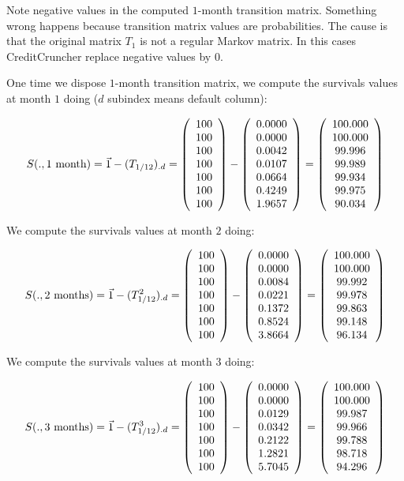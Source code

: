 \documentclass[a4paper,12pt,final]{article}
\begin{document}
Note negative values in the computed $1$-month transition matrix. Something wrong happens 
because transition matrix values are probabilities. The cause is that the original matrix 
$T_1$ is not a regular Markov matrix. In this cases CreditCruncher replace negative 
values by $0$.
\newline

One time we dispose $1$-month transition matrix, we compute the survivals
values at month $1$ doing ($d$ subindex means default column):

\begin{displaymath}
S(.,1 \textrm{ month}) = \vec{1} - (T_{1/12})_{.d} = 
\left( 
\begin{array}{c}
 100 \cr
 100 \cr
 100 \cr
 100 \cr
 100 \cr
 100 \cr
 100
\end{array}
\right)
 - 
\left( 
\begin{array}{c}
 0.0000 \cr
 0.0000 \cr
 0.0042 \cr
 0.0107 \cr
 0.0664 \cr
 0.4249 \cr
 1.9657
\end{array}
\right)
=
\left( 
\begin{array}{c}
 100.000 \cr
 100.000 \cr
  99.996 \cr
  99.989 \cr
  99.934 \cr
  99.975 \cr
  90.034 
\end{array}
\right)
\end{displaymath}

We compute the survivals values at month $2$ doing:

\begin{displaymath}
S(.,2 \textrm{ months}) = \vec{1} - (T_{1/12}^2)_{.d} = 
\left( 
\begin{array}{c}
 100 \cr
 100 \cr
 100 \cr
 100 \cr
 100 \cr
 100 \cr
 100
\end{array}
\right)
 - 
\left( 
\begin{array}{c}
 0.0000 \cr
 0.0000 \cr
 0.0084 \cr
 0.0221 \cr
 0.1372 \cr
 0.8524 \cr
 3.8664
\end{array}
\right)
=
\left( 
\begin{array}{c}
 100.000 \cr
 100.000 \cr
  99.992 \cr
  99.978 \cr
  99.863 \cr
  99.148 \cr
  96.134 
\end{array}
\right)
\end{displaymath}

We compute the survivals values at month $3$ doing:

\begin{displaymath}
S(.,3 \textrm{ months}) = \vec{1} - (T_{1/12}^3)_{.d} = 
\left( 
\begin{array}{c}
 100 \cr
 100 \cr
 100 \cr
 100 \cr
 100 \cr
 100 \cr
 100
\end{array}
\right)
 - 
\left( 
\begin{array}{c}
 0.0000 \cr
 0.0000 \cr
 0.0129 \cr
 0.0342 \cr
 0.2122 \cr
 1.2821 \cr
 5.7045
\end{array}
\right)
=
\left( 
\begin{array}{c}
 100.000 \cr
 100.000 \cr
  99.987 \cr
  99.966 \cr
  99.788 \cr
  98.718 \cr
  94.296 
\end{array}
\right)
\end{displaymath}
\end{document}
